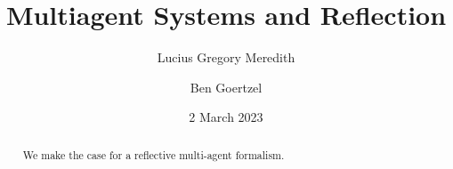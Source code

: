 \def\lastname{Meredith}

\title{Multiagent Systems and Reflection}

\date{2 March 2023}

\author{ Lucius Gregory Meredith \\
         \and 
         Ben Goertzel
}
 

\maketitle              %


\begin{abstract}

  We make the case for a reflective multi-agent formalism.

\end{abstract}



